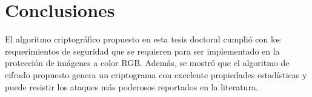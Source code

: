 \begin{table}[!htbp] %
	\center 
	\caption{Comparación del algoritmo de cifrado de imagen RGB propuesto en la tesis \textit{vs} algoritmo reciente reportado en literatura.}
\end{table}  

\section{Conclusiones}
El algoritmo criptográfico propuesto en esta tesis doctoral cumplió con los requerimientos de seguridad que se requieren para ser implementado en la protección de imágenes a color RGB. Además, se mostró que el algoritmo de cifrado propuesto genera un criptograma con excelente propiedades estadísticas y puede resistir los ataques más poderosos reportados en la literatura.

